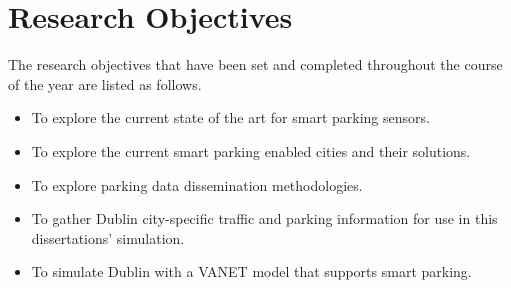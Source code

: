 \section{Research Objectives}
The research objectives that have been set and completed throughout the course of the year are listed as follows. 

\begin{itemize}
    \item To explore the current state of the art for smart parking sensors.
    \item To explore the current smart parking enabled cities and their solutions.
    \item To explore parking data dissemination methodologies.
    \item To gather Dublin city-specific traffic and parking information for use in this dissertations' simulation.
    \item To simulate Dublin with a \ac{VANET} model that supports smart parking.
\end{itemize}